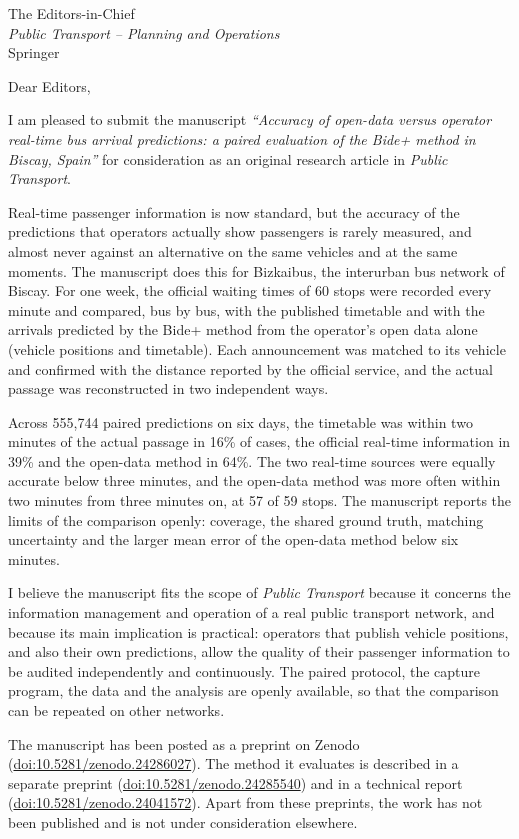 \documentclass[11pt,a4paper]{letter}
\date{\today}
\begin{document}
\begin{letter}{The Editors-in-Chief\\\emph{Public Transport -- Planning and Operations}\\Springer}

\opening{Dear Editors,}

I am pleased to submit the manuscript \emph{``Accuracy of open-data versus operator real-time bus arrival predictions:
a paired evaluation of the Bide+ method in Biscay, Spain''} for consideration as an original research article in
\emph{Public Transport}.

Real-time passenger information is now standard, but the accuracy of the predictions that operators actually show
passengers is rarely measured, and almost never against an alternative on the same vehicles and at the same moments.
The manuscript does this for Bizkaibus, the interurban bus network of Biscay. For one week, the official waiting times
of 60 stops were recorded every minute and compared, bus by bus, with the published timetable and with the arrivals
predicted by the Bide+ method from the operator's open data alone (vehicle positions and timetable). Each announcement
was matched to its vehicle and confirmed with the distance reported by the official service, and the actual passage was
reconstructed in two independent ways.

Across 555,744 paired predictions on six days, the timetable was within two minutes of the actual passage in 16\% of
cases, the official real-time information in 39\% and the open-data method in 64\%. The two real-time sources were
equally accurate below three minutes, and the open-data method was more often within two minutes from three minutes on,
at 57 of 59 stops. The manuscript reports the limits of the comparison openly: coverage, the shared ground truth,
matching uncertainty and the larger mean error of the open-data method below six minutes.

I believe the manuscript fits the scope of \emph{Public Transport} because it concerns the information management and
operation of a real public transport network, and because its main implication is practical: operators that publish
vehicle positions, and also their own predictions, allow the quality of their passenger information to be audited
independently and continuously. The paired protocol, the capture program, the data and the analysis are openly
available, so that the comparison can be repeated on other networks.

The manuscript has been posted as a preprint on Zenodo
(\href{https://doi.org/10.5281/zenodo.24286027}{doi:10.5281/zenodo.24286027}). The method it evaluates is described in
a separate preprint (\href{https://doi.org/10.5281/zenodo.24285540}{doi:10.5281/zenodo.24285540}) and in a technical
report (\href{https://doi.org/10.5281/zenodo.24041572}{doi:10.5281/zenodo.24041572}). Apart from these preprints, the
work has not been published and is not under consideration elsewhere.


\end{letter}
\end{document}
